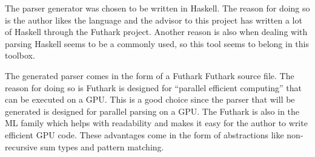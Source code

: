 The parser generator was chosen to be written in Haskell. The reason for doing so is the author likes the language and the advisor to this project has written a lot of Haskell through the Futhark project. Another reason is also when dealing with parsing Haskell seems to be a commonly used, so this tool seems to belong in this toolbox.

The generated parser comes in the form of a Futhark Futhark source file. The reason for doing so is Futhark is designed for ``parallel efficient computing'' \cite{futhark:homepage} that can be executed on a GPU. This is a good choice since the parser that will be generated is designed for parallel parsing on a GPU. The Futhark is also in the ML family which helps with readability and makes it easy for the author to write efficient GPU code. These advantages come in the form of abstractions like non-recursive sum types and pattern matching.

